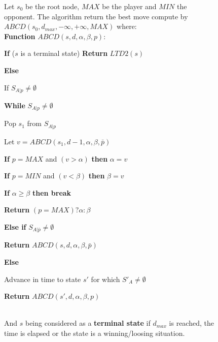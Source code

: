 \begin{figure}[h!t]
    \begin{algorithm}
        Let $s_0$ be the root node, $MAX$ be the player and $MIN$ the opponent. 
        The algorithm return the best move compute by $ABCD(s_0,d_{max},-\infty,+\infty,MAX)$ where: \ \\

        \textbf{Function} $ABCD(s,d,\alpha,\beta,p)$:
        \begin{enum}
        \item \textbf{If} ($s$ is a terminal state) \textbf{Return} $LTD2(s)$
        \item \textbf{Else}
            \begin{enum}
            \item If $S_{A|p} \neq \emptyset$ 

            \begin{enum}
            \item \textbf{While} $S_{A|p} \neq \emptyset$
                \begin{enum}
                \item Pop $s_1$ from $S_{A|p}$ 
                \item Let $v = ABCD(s_1,d-1,\alpha,\beta,\bar{p})$
                \item \textbf{If} $p = MAX$ and $(v > \alpha)$ \textbf{then} $\alpha = v$
                \item \textbf{If} $p = MIN$ and $(v < \beta)$ \textbf{then} $\beta= v$
                \item \textbf{If} $\alpha \geq \beta$ \textbf{then break} 
                \end{enum}
            \item \textbf{Return} $(p = MAX) ? \alpha : \beta$ 
            \end{enum}
        \item \textbf{Else if} $S_{A|\bar{p}} \neq \emptyset$
            \begin{enum}
            \item \textbf{Return} $ABCD(s,d,\alpha,\beta,\bar{p})$
            \end{enum}
        \item \textbf{Else} 
            \begin{enum}
            \item Advance in time to state $s'$ for which $S'_A \neq \emptyset$
            \item \textbf{Return} $ABCD(s',d,\alpha,\beta,p)$
            \end{enum}
        \end{enum}
        \end{enum}
        \ \\
        And $s$ being considered as a \textbf{terminal state} if $d_{max}$ is reached, the time is elapsed or the state is a winning/loosing situation.
        \label{algABCD}
    \end{algorithm}
\end{figure}

